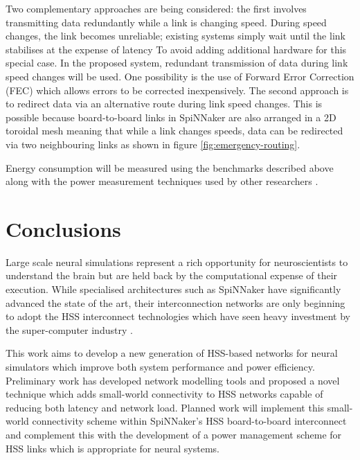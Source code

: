		Two complementary approaches are being considered: the first involves
		transmitting data redundantly while a link is changing speed. During speed
		changes, the link becomes unreliable; existing systems simply wait until the
		link stabilises at the expense of latency To avoid adding additional
		hardware for this special case. In the proposed system, redundant
		transmission of data during link speed changes will be used. One possibility
		is the use of Forward Error Correction (FEC) \cite{hamming50} which allows
		errors to be corrected inexpensively. The second approach is to redirect
		data via an alternative route during link speed changes. This is possible
		because board-to-board links in SpiNNaker are also arranged in a 2D toroidal
		mesh meaning that while a link changes speeds, data can be redirected via
		two neighbouring links as shown in figure \ref{fig:emergency-routing}.
		
		Energy consumption will be measured using the benchmarks described above
		along with the power measurement techniques used by other researchers
		\cite{sharp12,stromatias13}.


\section{Conclusions}
	
	Large scale neural simulations represent a rich opportunity for
	neuroscientists to understand the brain but are held back by the computational
	expense of their execution. While specialised architectures such as SpiNNaker
	have significantly advanced the state of the art, their interconnection
	networks are only beginning to adopt the HSS interconnect technologies which
	have seen heavy investment by the super-computer industry \cite{infinibandta}.
	
	This work aims to develop a new generation of HSS-based networks for neural
	simulators which improve both system performance and power efficiency.
	Preliminary work has developed network modelling tools and proposed a novel
	technique which adds small-world connectivity to HSS networks capable of
	reducing both latency and network load. Planned work will implement this
	small-world connectivity scheme within SpiNNaker's HSS board-to-board
	interconnect and complement this with the development of a power management
	scheme for HSS links which is appropriate for neural systems.
